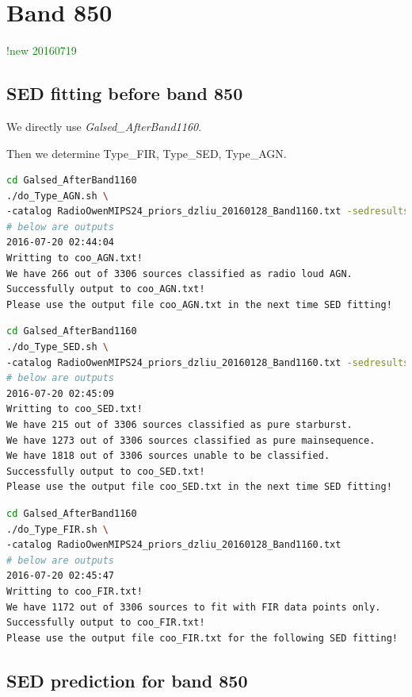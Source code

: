 \documentclass[11pt,a4paper]{article}
\begin{document}
\section{Band 850}

\textcolor{green}{!new 20160719}

\subsection{SED fitting before band 850}
\label{Band850_Galsed}

We directly use \textit{Galsed\_AfterBand1160}. 

Then we determine Type\_FIR, Type\_SED, Type\_AGN. 

\begin{lstlisting}[language=bash]
cd Galsed_AfterBand1160
./do_Type_AGN.sh \
-catalog RadioOwenMIPS24_priors_dzliu_20160128_Band1160.txt -sedresults ResLMT*.txt
# below are outputs
2016-07-20 02:44:04
Writting to coo_AGN.txt!
We have 266 out of 3306 sources classified as radio loud AGN.
Successfully output to coo_AGN.txt!
Please use the output file coo_AGN.txt in the next time SED fitting!
\end{lstlisting}

\begin{lstlisting}[language=bash]
cd Galsed_AfterBand1160
./do_Type_SED.sh \
-catalog RadioOwenMIPS24_priors_dzliu_20160128_Band1160.txt -sedresults ResLMT*.txt
# below are outputs
2016-07-20 02:45:09
Writting to coo_SED.txt!
We have 215 out of 3306 sources classified as pure starburst.
We have 1273 out of 3306 sources classified as pure mainsequence.
We have 1818 out of 3306 sources unable to be classified.
Successfully output to coo_SED.txt!
Please use the output file coo_SED.txt in the next time SED fitting!
\end{lstlisting}

\begin{lstlisting}[language=bash]
cd Galsed_AfterBand1160
./do_Type_FIR.sh \
-catalog RadioOwenMIPS24_priors_dzliu_20160128_Band1160.txt
# below are outputs
2016-07-20 02:45:47
Writting to coo_FIR.txt!
We have 1172 out of 3306 sources to fit with FIR data points only.
Successfully output to coo_FIR.txt!
Please use the output file coo_FIR.txt for the following SED fitting!
\end{lstlisting}

\subsection{SED prediction for band 850}
\label{Band850_Galpre}
\end{document}
